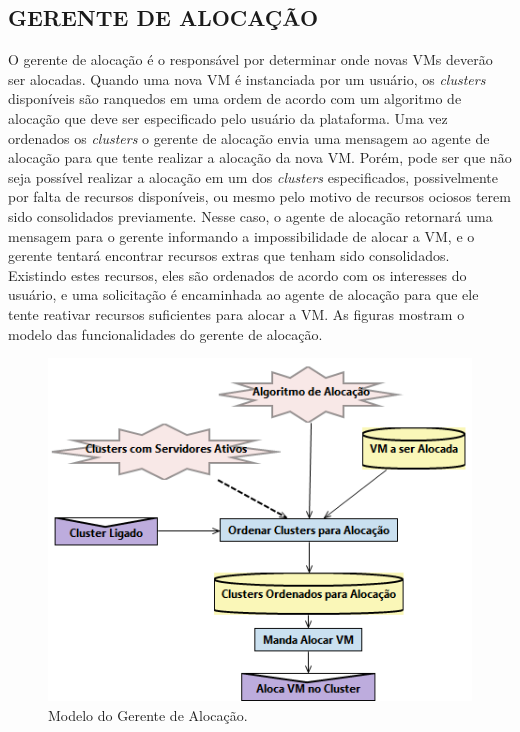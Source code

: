 \subsection{GERENTE DE ALOCAÇÃO}

O gerente de alocação é o responsável por determinar onde novas VMs deverão ser alocadas. Quando uma nova VM é instanciada por um usuário, os \emph{clusters} disponíveis são ranquedos em uma ordem de acordo com um algoritmo de alocação que deve ser especificado pelo usuário da plataforma. Uma vez ordenados os \emph{clusters} o gerente de alocação envia uma mensagem ao agente de alocação para que tente realizar a alocação da nova VM. Porém, pode ser que não seja possível realizar a alocação em um dos \emph{clusters} especificados, possivelmente por falta de recursos disponíveis, ou mesmo pelo motivo de recursos ociosos terem sido consolidados previamente. Nesse caso, o agente de alocação retornará uma mensagem para o gerente informando a impossibilidade de alocar a VM, e o gerente tentará encontrar recursos extras que tenham sido consolidados. Existindo estes recursos, eles são ordenados de acordo com os interesses do usuário, e uma solicitação é encaminhada ao agente de alocação para que ele tente reativar recursos suficientes para alocar a VM. As figuras mostram o modelo das funcionalidades do gerente de alocação.

\begin{figure}[!htb]
	\centering
	\caption{Modelo do Gerente de Alocação.}\label{fig:gerente-alocacao1}
	\includegraphics[width=1\textwidth]{figuras/gerente-alocacao1.png}
\end{figure}

